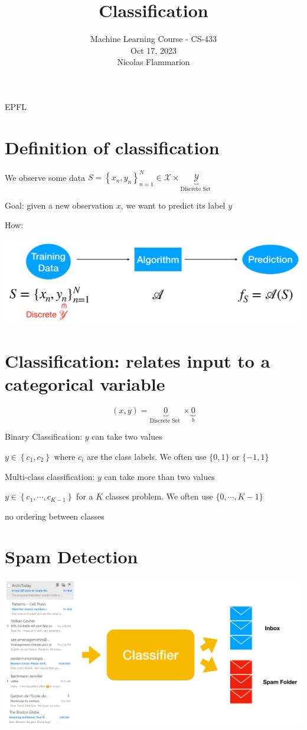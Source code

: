 \documentclass[10pt]{article}
\title{Classification }
\author{Machine Learning Course - CS-433\\
Oct 17, 2023\\
Nicolas Flammarion}
\date{}
\begin{document}
\maketitle
EPFL

\section*{Definition of classification}
We observe some data $S=\left\{x_{n}, y_{n}\right\}_{n=1}^{N} \in \mathscr{X} \times \underbrace{\mathscr{Y}}_{\text {Discrete Set }}$

Goal: given a new observation $x$, we want to predict its label $y$

How:

\begin{center}
\includegraphics[max width=\textwidth]{2023_12_30_cf784c471dfd1dd5afbag-02}
\end{center}

\section*{Classification: relates input to a categorical variable}
$$
(x, y)=\underbrace{0}_{\text {Discrete Set }} \times \underbrace{0}_{b}
$$

Binary Classification: $y$ can take two values

$y \in\left\{c_{1}, c_{2}\right\}$ where $c_{i}$ are the class labels. We often use $\{0,1\}$ or $\{-1,1\}$

Multi-class classification: $y$ can take more than two values

$y \in\left\{c_{1}, \cdots, c_{K-1}\right\}$ for a $K$ classes problem. We often use $\{0, \cdots, K-1\}$

no ordering between classes

\section*{Spam Detection}
\begin{center}
\includegraphics[max width=\textwidth]{2023_12_30_cf784c471dfd1dd5afbag-04}
\end{center}
\end{document}
